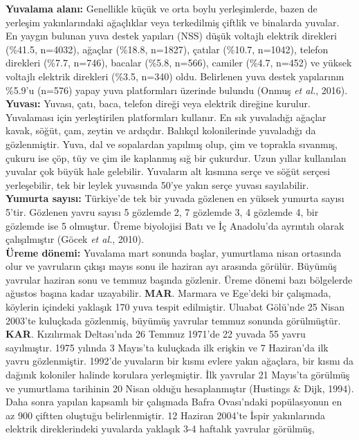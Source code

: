 \documentclass[
  a4paper,
  DIV=11,
  numbers=noendperiod]{scrreprt}
\begin{document}
\textbf{Yuvalama alanı:} Genellikle küçük ve orta boylu yerleşimlerde,
bazen de yerleşim yakınlarındaki ağaçlıklar veya terkedilmiş çiftlik ve
binalarda yuvalar. En yaygın bulunan yuva destek yapıları (NSS) düşük
voltajlı elektrik direkleri (\%41.5, n=4032), ağaçlar (\%18.8, n=1827),
çatılar (\%10.7, n=1042), telefon direkleri (\%7.7, n=746), bacalar
(\%5.8, n=566), camiler (\%4.7, n=452) ve yüksek voltajlı elektrik
direkleri (\%3.5, n=340) oldu. Belirlenen yuva destek yapılarının
\%5.9'u (n=576) yapay yuva platformları üzerinde bulundu (Onmuş \emph{et
al.}, 2016).\\
\textbf{Yuvası:} Yuvası, çatı, baca, telefon direği veya elektrik
direğine kurulur. Yuvalaması için yerleştirilen platformları kullanır.
En sık yuvaladığı ağaçlar kavak, söğüt, çam, zeytin ve ardıçdır.
Balıkçıl kolonilerinde yuvaladığı da gözlenmiştir. Yuva, dal ve
sopalardan yapılmış olup, çim ve toprakla sıvanmış, çukuru ise çöp, tüy
ve çim ile kaplanmış sığ bir çukurdur. Uzun yıllar kullanılan yuvalar
çok büyük hale gelebilir. Yuvaların alt kısmına serçe ve söğüt serçesi
yerleşebilir, tek bir leylek yuvasında 50'ye yakın serçe yuvası
sayılabilir.\\
\textbf{Yumurta sayısı:} Türkiye'de tek bir yuvada gözlenen en yüksek
yumurta sayısı 5'tir. Gözlenen yavru sayısı 5 gözlemde 2, 7 gözlemde 3,
4 gözlemde 4, bir gözlemde ise 5 olmuştur. Üreme biyolojisi Batı ve İç
Anadolu'da ayrıntılı olarak çalışılmıştır (Göcek \emph{et al.}, 2010).\\
\textbf{Üreme dönemi:} Yuvalama mart sonunda başlar, yumurtlama nisan
ortasında olur ve yavruların çıkışı mayıs sonu ile haziran ayı arasında
görülür. Büyümüş yavrular haziran sonu ve temmuz başında gözlenir. Üreme
dönemi bazı bölgelerde ağustos başına kadar uzayabilir. \textbf{MAR}.
Marmara ve Ege'deki bir çalışmada, köylerin içindeki yaklaşık 170 yuva
tespit edilmiştir. Uluabat Gölü'nde 25 Nisan 2003'te kuluçkada
gözlenmiş, büyümüş yavrular temmuz sonunda görülmüştür. \textbf{KAR}.
Kızılırmak Deltası'nda 26 Temmuz 1971'de 22 yuvada 55 yavru sayılmıştır.
1975 yılında 3 Mayıs'ta kuluçkada ilk erişkin ve 7 Haziran'da ilk yavru
gözlenmiştir. 1992'de yuvaların bir kısmı evlere yakın ağaçlara, bir
kısmı da dağınık koloniler halinde korulara yerleşmiştir. İlk yavrular
21 Mayıs'ta görülmüş ve yumurtlama tarihinin 20 Nisan olduğu
hesaplanmıştır (Hustings \& Dijk, 1994). Daha sonra yapılan kapsamlı bir
çalışmada Bafra Ovası'ndaki popülasyonun en az 900 çiftten oluştuğu
belirlenmiştir. 12 Haziran 2004'te İspir yakınlarında elektrik
direklerindeki yuvalarda yaklaşık 3-4 haftalık yavrular görülmüş,
\end{document}
